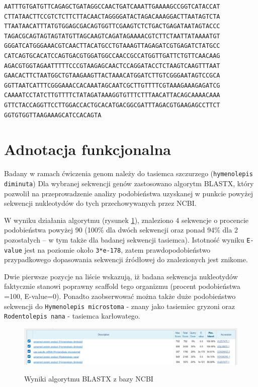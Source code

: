 \documentclass[a4paper]{article}
\begin{document}
\begin{verbatim}
AATTTGTGATGTTCAGAGCTGATAGGCCAACTGATCAAATTGAAAAGCCGGTCATACCAT
CTTATAACTTCCGTCTCTTCTTACAACTAGGGGATACTAGACAAAGGACTTAATAGTCTA
TTAATAACATTTATGTGGAGCGACAGTGGTTCGAAGTCTCTGACTGAGATAATAGTACCC
TAGACGCAGTAGTAGTATGTTAGCAAGTCAGATAGAAAACGTCTTCTAATTATAAAATGT
GGGATCATGGGAAACGTCAACTTACATGCCTGTAAAGTTAGAGATCGTGAGATCTATGCC
CATCAGTGCACATCCAGTGACGTGGATGGCCAACCGCCATGGTTGATTCTGTTCAACAAG
AGACGTGGTAGAATTTTTCCCGTAAGAGCAACTCCAGGATACCTCTAAGTCAAGTTTAAT
GAACACTTCTAATGGCTGTAAGAAGTTACTAAACATGGATCTTGTCGGGAATAGTCCGCA
GGTTAATCATTTCGGGAAACCACAAATAGCAATCGCTTGTTTTCGTAAAGAAAGAGATCG
CAAAATCCTATCTTGTTTTCTATAGATAAAGGTGTTTCTTTAACATTACAGCAAAACAAA
GTTCTACCAGGTTCCTTGGACCACTGCACATGACGGCGATTTAGACGTGAAGAGCCTTCT
GGTGTGGTTAAGAAAGCATCCACAGTA
\end{verbatim}


\section{Adnotacja funkcjonalna}

Badany w ramach ćwiczenia genom należy do tasiemca szczurzego (\texttt{hymenolepis diminuta})
Dla wybranej sekwencji genów zastosowano algorytm BLASTX, który pozwolił na przeprowadzenie analizy podobieństwa uzyskanej w punkcie powyżej sekwencji nukleotydów do tych przechowywanych przez NCBI.

W wyniku działania algorytmu (rysunek \ref{fig:result}), znaleziono 4 sekwencje o procencie podobieństwa powyżej 90
(100\% dla dwóch sekwencji oraz ponad 94\% dla 2 pozostałych -- w tym także dla badanej sekwencji tasiemca).
Istotność wyniku \texttt{E-value} jest na poziomie około \texttt{3*e-178}, zatem prawdopodobieństwo przypadkowego dopasowania
sekwencji źródłowej do znalezionych jest znikome.

Dwie pierwsze pozycje na liście wskazują, iż badana sekwencja nukleotydów faktycznie stanowi poprawny scaffold tego organizmu 
(procent podobieństwa =100, E-value=0). Ponadto zaobserwować można także duże podobieństwo sekwencji do \texttt{Hymenolepis microstoma} - znany jako tasiemiec gryzoni oraz \texttt{Rodentolepis nana} - tasiemca karłowatego.

\begin{figure}[h]
    \centering
    \includegraphics[width=1.0\textwidth]{result.png}
    \label{fig:result}
    \caption[]{Wyniki algorytmu BLASTX z bazy NCBI}
\end{figure}
\end{document}
